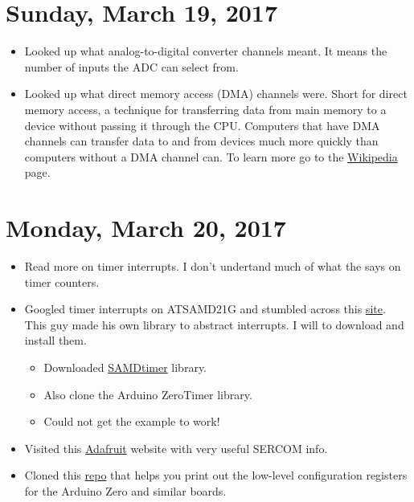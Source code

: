 \documentclass[12pt]{article}
\begin{document}
\section{Sunday, March 19, 2017}
\begin{itemize}
\item Looked up what analog-to-digital converter channels meant. It means the number of inputs the ADC can select from.
\item Looked up what direct memory access (DMA) channels were. Short for direct memory access, a technique for transferring data from main memory to a device without passing it through the CPU. Computers that have DMA channels can transfer data to and from devices much more quickly than computers without a DMA channel can. To learn more go to the \href{https://en.wikipedia.org/wiki/Direct_memory_access}{Wikipedia} page.
\end{itemize}

\section{Monday, March 20, 2017}
\begin{itemize}
\item Read more on timer interrupts. I don't undertand much of what the says on timer counters.
\item Googled timer interrupts on ATSAMD21G and stumbled across this \href{http://www.avdweb.nl/arduino/libraries/samd21-timer.html}{site}. This guy made his own library to abstract interrupts. I will to download and install them.
	\begin{itemize}
	\item Downloaded \href{https://github.com/avandalen/avdweb_SAMDtimer}{SAMDtimer} library.
	\item Also clone the Arduino ZeroTimer library.
	\item Could not get the example to work!
	\end{itemize}
\item Visited this \href{https://learn.adafruit.com/using-atsamd21-sercom-to-add-more-spi-i2c-serial-ports/muxing-it-up}{Adafruit} website with very useful SERCOM info.
\item Cloned this \href{https://github.com/drewfish/arduino-ZeroRegs}{repo} that helps you print out the low-level configuration registers for the Arduino Zero and similar boards.
\end{itemize}
\end{document}
